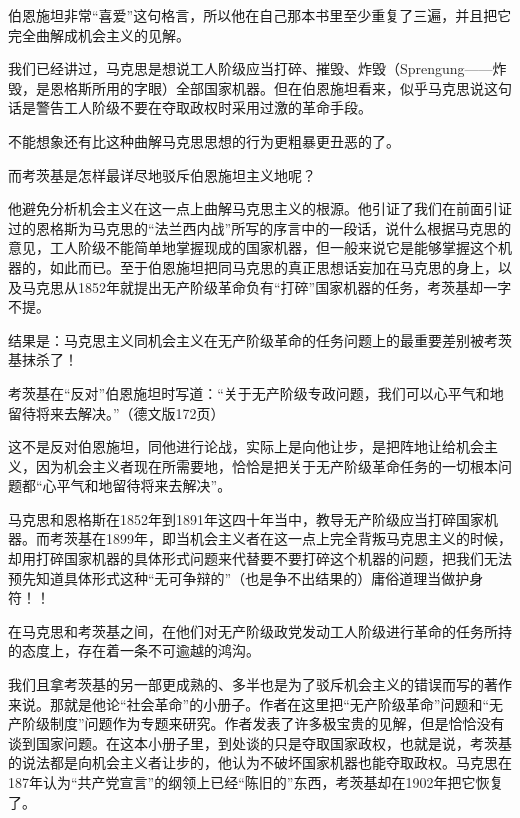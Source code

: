伯恩施坦非常“喜爱”这句格言，所以他在自己那本书里至少重复了三遍，并且把它完全曲解成机会主义的见解。

我们已经讲过，马克思是想说工人阶级应当{\kaishu 打碎、摧毁、炸毁}（Sprengung——炸毁，是恩格斯所用的字眼）全部国家机器。但在伯恩施坦看来，似乎马克思说这句话是警告工人阶级{\kaishu 不要}在夺取政权时采用过激的革命手段。

不能想象还有比这种曲解马克思思想的行为更粗暴更丑恶的了。

而考茨基是怎样最详尽地驳斥伯恩施坦主义地呢？

他避免分析机会主义在这一点上曲解马克思主义的根源。他引证了我们在前面引证过的恩格斯为马克思的“法兰西内战”所写的序言中的一段话，说什么根据马克思的意见，工人阶级不能{\kaishu 简单地}掌握{\kaishu 现成的}国家机器，但一般来说它是{\kaishu 能够}掌握这个机器的，如此而已。至于伯恩施坦把同马克思的真正思想话妄加在马克思的身上，以及马克思从1852年就提出无产阶级革命负有“打碎”国家机器的任务，考茨基却一字不提。

结果是：马克思主义同机会主义在无产阶级革命的任务问题上的最重要差别被考茨基抹杀了！

\pskip
\leftskip=10mm
\small

考茨基在“{\kaishu 反对}”伯恩施坦时写道：“关于无产阶级专政问题，我们可以心平气和地留待将来去解决。”（德文版172页）

\normalsize
\leftskip=0mm
\pskip

这不是{\kaishu 反对}伯恩施坦，同他进行论战，实际上是向他{\kaishu 让步}，是把阵地让给机会主义，因为机会主义者现在所需要地，恰恰是把关于无产阶级革命任务的一切根本问题都“心平气和地留待将来去解决”。

马克思和恩格斯在1852年到1891年这四十年当中，教导无产阶级应当打碎国家机器。而考茨基在1899年，即当机会主义者在这一点上完全背叛马克思主义的时候，却用打碎国家机器的具体形式问题来{\kaishu 代替}要不要打碎这个机器的问题，把我们无法预先知道具体形式这种“无可争辩的”（也是争不出结果的）庸俗道理当做护身符！！

在马克思和考茨基之间，在他们对无产阶级政党发动工人阶级进行革命的任务所持的态度上，存在着一条不可逾越的鸿沟。

我们且拿考茨基的另一部更成熟的、多半也是为了驳斥机会主义的错误而写的著作来说。那就是他论“社会革命”的小册子。作者在这里把“无产阶级革命”问题和“无产阶级制度”问题作为专题来研究。作者发表了许多极宝贵的见解，但是恰恰没有{\kaishu 谈到}国家问题。在这本小册子里，到处谈的只是夺取国家政权，也就是说，考茨基的说法都是向机会主义者让步的，他认为{\kaishu 不}破坏国家机器也{\kaishu 能}夺取政权。马克思在187年认为“共产党宣言”的纲领上已经“陈旧的”东西，考茨基却在1902年把它{\kaishu 恢复}了。

